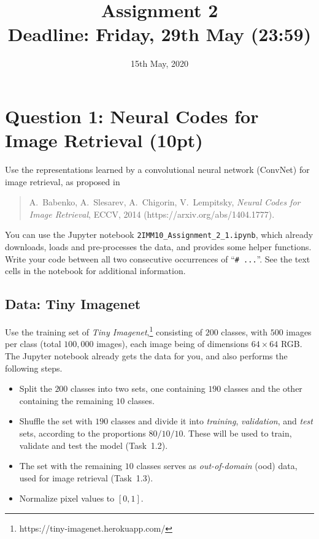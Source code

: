 \documentclass[a4paper,twoside,10pt]{article}
\title{\vspace{-\baselineskip}\sffamily\bfseries Assignment 2 \\
	\large Deadline: Friday, 29th May (23:59)}
\date{15th May, 2020}
\begin{document}
	\maketitle
	
	
	\section*{Question 1: Neural Codes for Image Retrieval (10pt)}
	
	Use the representations learned by a convolutional neural network (ConvNet) for image retrieval, as proposed in 
	\begin{quote}
		A.~Babenko, A.~Slesarev, A.~Chigorin, V.~Lempitsky, \textit{Neural Codes for Image Retrieval}, ECCV, 2014 (https://arxiv.org/abs/1404.1777).
	\end{quote}
	You can use the Jupyter notebook \verb!2IMM10_Assignment_2_1.ipynb!, which already downloads, loads and pre-processes the data, and provides some helper functions.
	Write your code between all two consecutive occurrences of ``\verb!# ...!''.
	See the text cells in the notebook for additional information.
	
	
	\subsection*{Data: Tiny Imagenet}
	Use the training set of \emph{Tiny Imagenet},\footnote{https://tiny-imagenet.herokuapp.com/} consisting of $200$ classes, with $500$ images per class (total $100,000$ images), each image being of dimensions $64 \times 64$ RGB.
	The Jupyter notebook already gets the data for you, and also performs the following steps.
	\begin{itemize}
		\item Split the $200$ classes into two sets, one containing $190$ classes and the other containing the remaining $10$ classes.
		\item Shuffle the set with $190$ classes and divide it into \emph{training}, \emph{validation}, and \emph{test} sets, according to the proportions $80/10/10$.
		These will be used to train, validate and test the model (Task~1.2).
		\item The set with the remaining $10$ classes serves as \emph{out-of-domain} (ood) data, used for image retrieval (Task~1.3).
		\item Normalize pixel values to $[0,1]$.
	\end{itemize}
	
	
\end{document}
